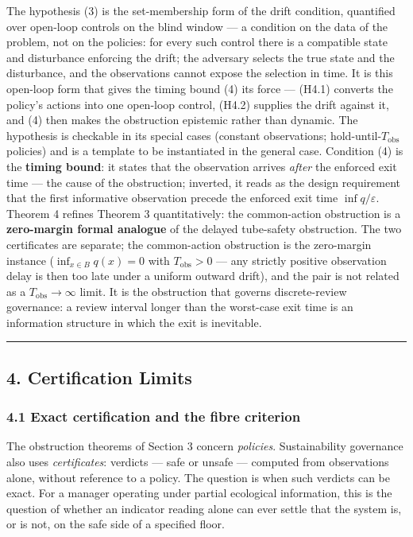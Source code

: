 \documentclass[11pt]{article}
\begin{document}
The hypothesis (3) is the set-membership form of the drift condition,
quantified over open-loop controls on the blind window --- a condition
on the data of the problem, not on the policies: for every such control
there is a compatible state and disturbance enforcing the drift; the
adversary selects the true state and the disturbance, and the
observations cannot expose the selection in time. It is this open-loop form that gives the timing bound (4) its force --- (H4.1) converts
the policy's actions into one open-loop control, (H4.2) supplies the
drift against it, and (4) then makes the obstruction epistemic rather
than dynamic. The hypothesis is checkable in its special cases (constant
observations; hold-until-\(T_{\mathrm{obs}}\) policies) and is a template to be instantiated in the general case. Condition (4) is
the \textbf{timing bound}: it states that the observation arrives
\emph{after} the enforced exit time --- the cause of the obstruction; inverted, it reads as the design requirement that the first informative observation precede the enforced exit time
\(\inf q / \varepsilon\). Theorem 4 refines Theorem 3 quantitatively:
the common-action obstruction is a \textbf{zero-margin formal analogue}
of the delayed tube-safety obstruction. The two certificates are separate; the common-action obstruction is the zero-margin instance
(\(\inf_{x \in B} q(x) = 0\) with \(T_{\mathrm{obs}} > 0\) --- any
strictly positive observation delay is then too late under a uniform
outward drift), and the pair is not related as a
\(T_{\mathrm{obs}} \to \infty\) limit. It is the obstruction that
governs discrete-review governance: a review interval longer than the
worst-case exit time is an information structure in which the exit is
inevitable.

\begin{center}\rule{0.5\linewidth}{0.5pt}\end{center}

\subsection{4. Certification Limits}\label{certification-limits}

\subsubsection{4.1 Exact certification and the fibre
criterion}\label{exact-certification-and-the-fibre-criterion}

The obstruction theorems of Section 3 concern \emph{policies}.
Sustainability governance also uses \emph{certificates}: verdicts
--- safe or unsafe --- computed from observations alone, without
reference to a policy. The question is when such verdicts can be exact.
For a manager operating under partial ecological information, this is
the question of whether an indicator reading alone can ever settle that
the system is, or is not, on the safe side of a specified floor.
\end{document}
